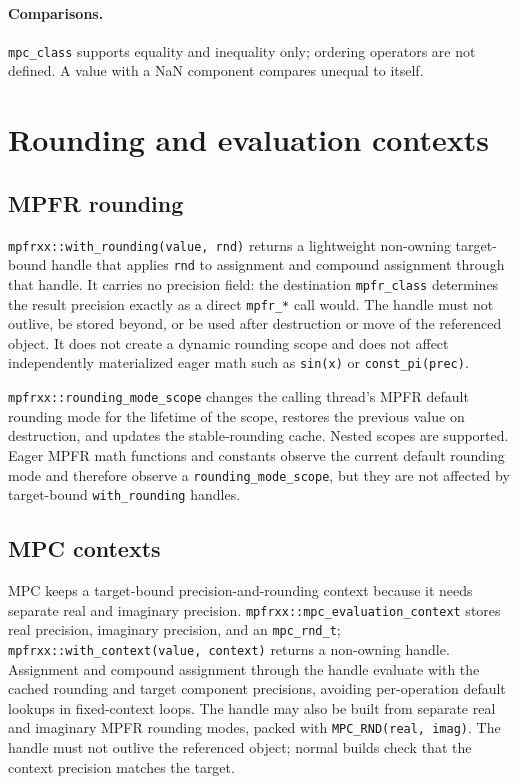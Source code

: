 \documentclass[11pt,a4paper]{article}
\newcommand{\code}[1]{\lstinline!#1!}
\begin{document}
\paragraph{Comparisons.} \code{mpc_class} supports equality and inequality only;
ordering operators are not defined. A value with a NaN component compares unequal
to itself.

\section{Rounding and evaluation contexts}

\subsection{MPFR rounding}

\code{mpfrxx::with_rounding(value, rnd)} returns a lightweight non-owning
target-bound handle that applies \code{rnd} to assignment and compound
assignment through that handle. It carries no precision field: the destination
\code{mpfr_class} determines the result precision exactly as a direct
\code{mpfr_*} call would. The handle must not outlive, be stored beyond, or be
used after destruction or move of the referenced object. It does not create a
dynamic rounding scope and does not affect independently materialized eager math
such as \code{sin(x)} or \code{const_pi(prec)}.

\code{mpfrxx::rounding_mode_scope} changes the calling thread's MPFR default
rounding mode for the lifetime of the scope, restores the previous value on
destruction, and updates the stable-rounding cache. Nested scopes are supported.
Eager MPFR math functions and constants observe the current default rounding mode
and therefore observe a \code{rounding_mode_scope}, but they are not affected by
target-bound \code{with_rounding} handles.

\subsection{MPC contexts}

MPC keeps a target-bound precision-and-rounding context because it needs separate
real and imaginary precision. \code{mpfrxx::mpc_evaluation_context} stores real
precision, imaginary precision, and an \code{mpc_rnd_t};
\code{mpfrxx::with_context(value, context)} returns a non-owning handle.
Assignment and compound assignment through the handle evaluate with the cached
rounding and target component precisions, avoiding per-operation default lookups
in fixed-context loops. The handle may also be built from separate real and
imaginary MPFR rounding modes, packed with \code{MPC_RND(real, imag)}. The handle
must not outlive the referenced object; normal builds check that the context
precision matches the target.
\end{document}
